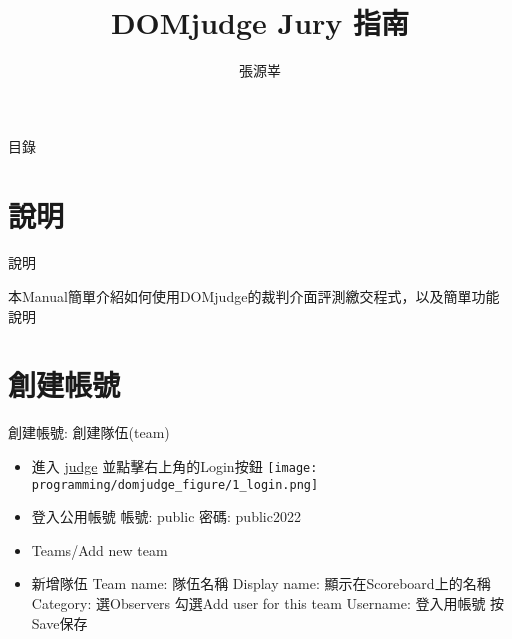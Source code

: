 \documentclass[aspectratio=169,xcolor=dvipsnames]{beamer}
\title[short title]{DOMjudge Jury 指南}
\author{張源峷}
\date{}
\begin{document}
    \begin{frame}
        \titlepage
    \end{frame}

    \begin{frame}{目錄}
        \tableofcontents
    \end{frame}

    \section{說明}

    \begin{frame}{說明}
        \centerline{本Manual簡單介紹如何使用DOMjudge的裁判介面評測繳交程式，以及簡單功能說明}
    \end{frame}

    \section{創建帳號}

    \begin{frame}{創建帳號: 創建隊伍(team)}
        \begin{itemize}
            \item 進入 \href{http://127.0.0.1}{judge} 並點擊右上角的Login按鈕
            \texttt{[image: programming/domjudge\_figure/1\_login.png]}
            \item 登入公用帳號 \newline
                帳號: public \newline
                密碼: public2022
            \item Teams/Add new team
            \item 新增隊伍 \newline
                Team name: 隊伍名稱\newline
                Display name: 顯示在Scoreboard上的名稱\newline
                Category: 選Observers\newline
                勾選Add user for this team \newline
                Username: 登入用帳號 \newline
                按Save保存
        \end{itemize}
    \end{frame}
    
\end{document}
